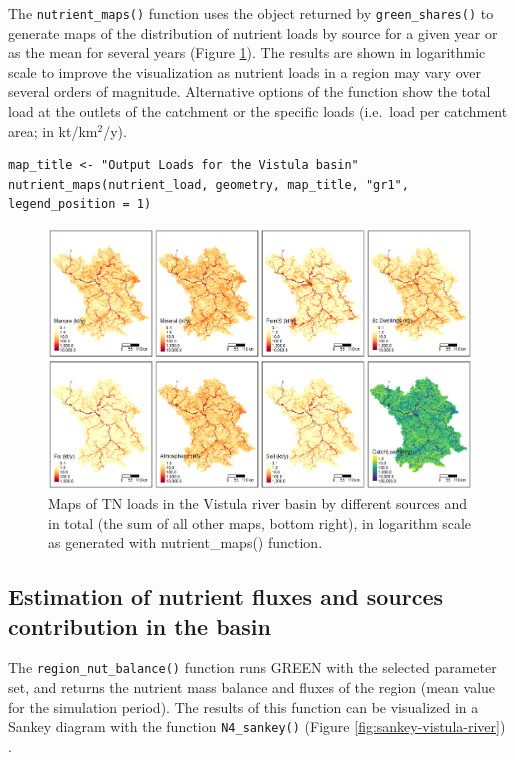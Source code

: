 \noindent The \texttt{nutrient\_maps()} function uses the object returned by \texttt{green\_shares()} to generate maps of the distribution of nutrient loads by source for a given year or as the mean for several years (Figure \ref{fig:maps-TN-vistula-river}). The results are shown in logarithmic scale to improve the visualization as nutrient loads in a region may vary over several orders of magnitude. Alternative options of the function show the total load at the outlets of the catchment or the specific loads (i.e.~load per catchment area; in kt/km\(^2\)/y).

\begin{verbatim}
map_title <- "Output Loads for the Vistula basin"
nutrient_maps(nutrient_load, geometry, map_title, "gr1", legend_position = 1)
\end{verbatim}

\begin{figure}[H]
\includegraphics[width=1\linewidth,height=0.25\textheight]{figures/fig9} \caption{Maps of TN loads in the Vistula river basin by different sources and in total (the sum of all other maps, bottom right), in logarithm scale as generated with nutrient\_maps() function.}\label{fig:maps-TN-vistula-river}
\end{figure}

\hypertarget{estimation-of-nutrient-fluxes-and-sources-contribution-in-the-basin}{%
\subsection{Estimation of nutrient fluxes and sources contribution in the basin}\label{estimation-of-nutrient-fluxes-and-sources-contribution-in-the-basin}}

The \texttt{region\_nut\_balance()} function runs GREEN with the selected parameter set, and returns the nutrient mass balance and fluxes of the region (mean value for the simulation period). The results of this function can be visualized in a Sankey diagram with the function \texttt{N4\_sankey()} (Figure \ref{fig:sankey-vistula-river}) .

